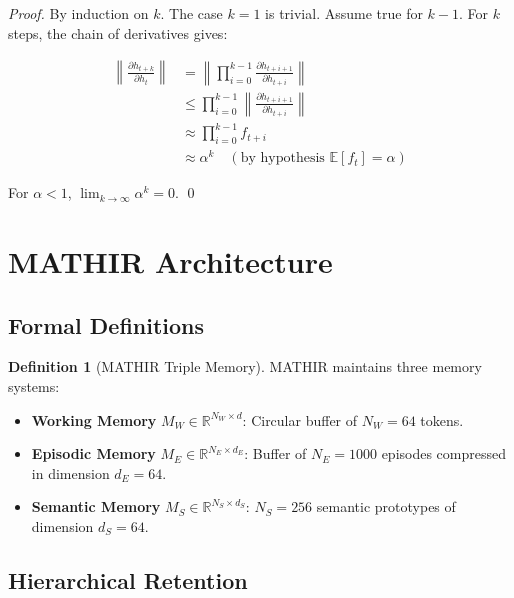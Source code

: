 \documentclass[12pt]{article}
\theoremstyle{definition}
\newtheorem{definition}{Definition}
\begin{document}
\begin{proof}
By induction on $k$. The case $k=1$ is trivial. Assume true for $k-1$.
For $k$ steps, the chain of derivatives gives:

\begin{align}
\left\| \frac{\partial h_{t+k}}{\partial h_t} \right\| 
&= \left\| \prod_{i=0}^{k-1} \frac{\partial h_{t+i+1}}{\partial h_{t+i}} \right\| \\
&\leq \prod_{i=0}^{k-1} \left\| \frac{\partial h_{t+i+1}}{\partial h_{t+i}} \right\| \\
&\approx \prod_{i=0}^{k-1} f_{t+i} \\
&\approx \alpha^k \quad (\text{by hypothesis } \mathbb{E}[f_t] = \alpha)
\end{align}

For $\alpha < 1$, $\lim_{k \to \infty} \alpha^k = 0$. \qed
\end{proof}

\section{MATHIR Architecture}

\subsection{Formal Definitions}

\begin{definition}[MATHIR Triple Memory]
MATHIR maintains three memory systems:

\begin{itemize}
\item \textbf{Working Memory} $M_W \in \mathbb{R}^{N_W \times d}$: 
      Circular buffer of $N_W = 64$ tokens.
      
\item \textbf{Episodic Memory} $M_E \in \mathbb{R}^{N_E \times d_E}$: 
      Buffer of $N_E = 1000$ episodes compressed in dimension $d_E = 64$.
      
\item \textbf{Semantic Memory} $M_S \in \mathbb{R}^{N_S \times d_S}$: 
      $N_S = 256$ semantic prototypes of dimension $d_S = 64$.
\end{itemize}
\end{definition}

\subsection{Hierarchical Retention}
\end{document}
